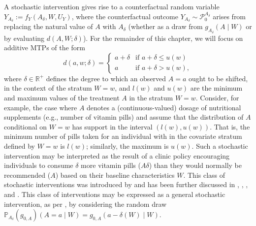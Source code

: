 \documentclass[
  12pt, krantz2,
]{krantz}
\renewcommand{\P}{\mathbb{P}}
\newcommand{\1}{\mathbbm{1}}
\theoremstyle{definition}
\theoremstyle{definition}
\theoremstyle{definition}
\theoremstyle{definition}
\theoremstyle{remark}
\begin{document}
A stochastic intervention gives rise to a counterfactual random variable
\(Y_{A_{\delta}} := f_Y(A_{\delta}, W, U_Y)\), where the counterfactual outcome
\(Y_{A_{\delta}} \sim \mathcal{P}_0^{A_{\delta}}\) arises from replacing the
natural value of \(A\) with \(A_{\delta}\) (whether as a draw from
\(g_{A_{\delta}}(A \mid W)\) or by evaluating \(d(A, W; \delta)\)). For the
remainder of this chapter, we will focus on additive MTPs of the form
\begin{equation}
  d(a, w; \delta) =
  \begin{cases}
    a + \delta & \text{if } a + \delta \leq u(w) \\
    a & \text{if } a + \delta > u(w),
  \end{cases}
  \label{eq:shift}
\end{equation}
where \(\delta \in \mathbb{R}^{+}\) defines the degree to which an observed \(A = a\)
ought to be shifted, in the context of the stratum \(W = w\), and \(l(w)\) and
\(u(w)\) are the minimum and maximum values of the treatment \(A\) in the stratum
\(W = w\). Consider, for example, the case where \(A\) denotes a (continuous-valued)
dosage of nutritional supplements (e.g., number of vitamin pills) and assume
that the distribution of \(A\) conditional on \(W = w\) has support in the interval
\((l(w), u(w))\). That is, the minimum number of pills taken for an individual
with in the covariate stratum defined by \(W = w\) is \(l(w)\); similarly, the
maximum is \(u(w)\). Such a stochastic intervention may be interpreted as the
result of a clinic policy encouraging individuals to consume \(\delta\) more
vitamin pills (\(A \delta\)) than they would normally be recommended (\(A\)) based
on their baseline characteristics \(W\). This class of stochastic interventions
was introduced by \citet{diaz2012population} and has been further discussed in
\citet{haneuse2013estimation}, \citet{diaz2018stochastic}, \citet{hejazi2020efficient}, and
\citet{hejazi2021semiparametric}. This class of interventions may be expressed as a
general stochastic intervention, as per \citet{diaz2012population}, by considering the
random draw \(\P_{A_{\delta}}(g_{0, A})(A = a \mid W) = g_{0,A}(a - \delta(W) \mid W)\).
\end{document}
